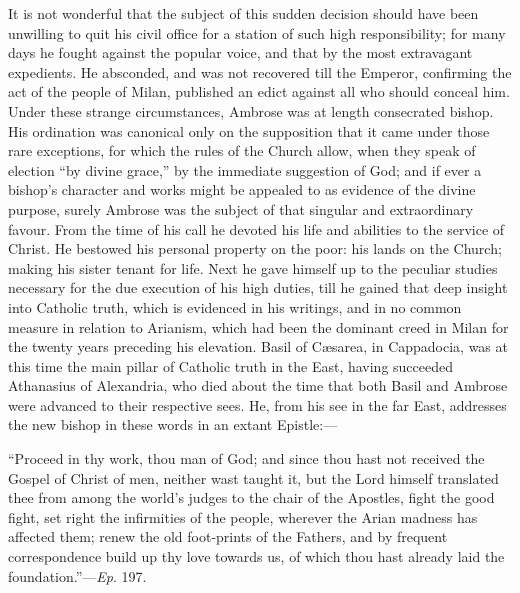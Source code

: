 It is not wonderful that the subject of this sudden decision should
have been unwilling to quit his civil office for a station of such
high responsibility; for many days he fought against the popular
voice, and that by the most extravagant expedients. He absconded, and
was not recovered till the Emperor, confirming the act of the people
of Milan, published an edict against all who should conceal him. Under
these strange circumstances, Ambrose was at length consecrated bishop.
His ordination was canonical only on the supposition that it came under those rare exceptions, for which the rules of the Church
allow, when they speak of election ``by divine grace,'' by the
immediate suggestion of God; and if ever a bishop's character and
works might be appealed to as evidence of the divine purpose, surely
Ambrose was the subject of that singular and extraordinary favour.
From the time of his call he devoted his life and abilities to the
service of Christ. He bestowed his personal property on the poor: his
lands on the Church; making his sister tenant for life. Next he gave
himself up to the peculiar studies necessary for the due execution of
his high duties, till he gained that deep insight into Catholic truth,
which is evidenced in his writings, and in no common measure in
relation to Arianism, which had been the dominant creed in Milan for
the twenty years preceding his elevation. Basil of Cæsarea, in
Cappadocia, was at this time the main pillar of Catholic truth in the
East, having succeeded Athanasius of Alexandria, who died about the
time that both Basil and Ambrose were advanced to their respective
sees. He, from his see in the far East, addresses the new bishop in
these words in an extant Epistle:—

``Proceed in thy work, thou man of God; and since thou hast not
received the Gospel of Christ of men, neither wast taught it, but the
Lord himself translated thee from among the world's judges to the
chair of the Apostles, fight the good fight, set right the infirmities
of the people, wherever the Arian madness has affected them; renew the
old foot-prints of the Fathers, and by frequent correspondence build
up thy love towards us, of which thou hast already laid the
foundation.''—\emph{Ep}. 197.

